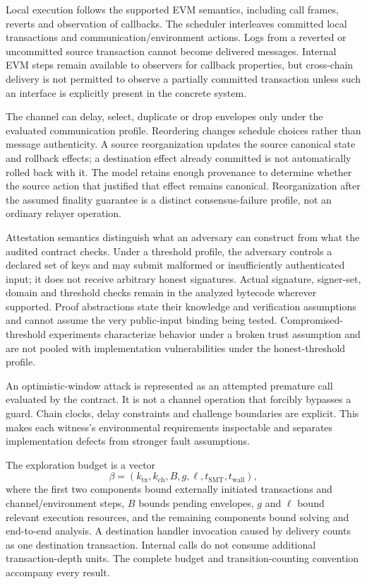 \documentclass[journal]{IEEEtran}
\theoremstyle{definition}
\begin{document}
Local execution follows the supported EVM semantics, including call frames, reverts and observation of callbacks. The scheduler interleaves committed local transactions and communication/environment actions. Logs from a reverted or uncommitted source transaction cannot become delivered messages. Internal EVM steps remain available to observers for callback properties, but cross-chain delivery is not permitted to observe a partially committed transaction unless such an interface is explicitly present in the concrete system.

The channel can delay, select, duplicate or drop envelopes only under the evaluated communication profile. Reordering changes schedule choices rather than message authenticity. A source reorganization updates the source canonical state and rollback effects; a destination effect already committed is not automatically rolled back with it. The model retains enough provenance to determine whether the source action that justified that effect remains canonical. Reorganization after the assumed finality guarantee is a distinct consensus-failure profile, not an ordinary relayer operation.

Attestation semantics distinguish what an adversary can construct from what the audited contract checks. Under a threshold profile, the adversary controls a declared set of keys and may submit malformed or insufficiently authenticated input; it does not receive arbitrary honest signatures. Actual signature, signer-set, domain and threshold checks remain in the analyzed bytecode wherever supported. Proof abstractions state their knowledge and verification assumptions and cannot assume the very public-input binding being tested. Compromised-threshold experiments characterize behavior under a broken trust assumption and are not pooled with implementation vulnerabilities under the honest-threshold profile.

An optimistic-window attack is represented as an attempted premature call evaluated by the contract. It is not a channel operation that forcibly bypasses a guard. Chain clocks, delay constraints and challenge boundaries are explicit. This makes each witness's environmental requirements inspectable and separates implementation defects from stronger fault assumptions.

The exploration budget is a vector
\[
\beta=(k_{\mathrm{tx}},k_{\mathrm{ch}},B,g,\ell,t_{\mathrm{SMT}},t_{\mathrm{wall}}),
\]
where the first two components bound externally initiated transactions and channel/environment steps, $B$ bounds pending envelopes, $g$ and $\ell$ bound relevant execution resources, and the remaining components bound solving and end-to-end analysis. A destination handler invocation caused by delivery counts as one destination transaction. Internal calls do not consume additional transaction-depth units. The complete budget and transition-counting convention accompany every result.
\end{document}
